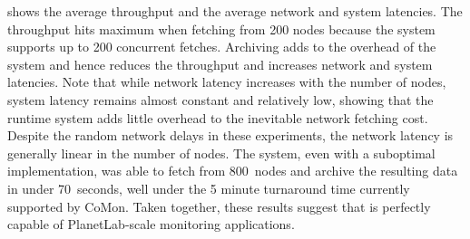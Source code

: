  shows the average throughput
and the average network and system latencies.
The throughput hits maximum when fetching from 200 nodes because
the system supports up to 200 concurrent fetches.
Archiving adds to the overhead of the system and hence
reduces the throughput and increases network and system latencies. 
Note that while network latency increases with the number of nodes,  
system latency remains almost constant and relatively
low, showing that the \padsd{} runtime system adds
little overhead to the inevitable network fetching
cost. Despite the random network delays in these experiments,
the network latency is generally linear in the number of nodes. 
The system, even with a suboptimal implementation, was able to fetch from 
800~nodes and archive the resulting data in under 70~seconds, well under the
5 minute turnaround time currently supported by CoMon. 
Taken together, these results suggest that \padsd{} is perfectly 
capable of PlanetLab-scale monitoring applications. 




